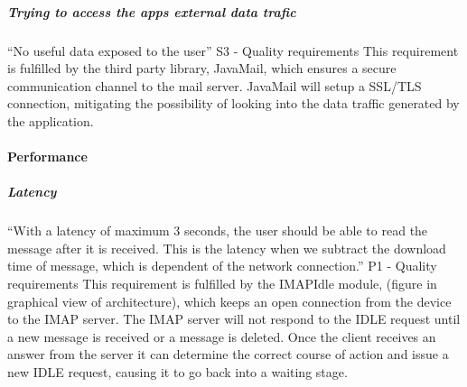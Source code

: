 \subparagraph{Trying to access the apps external data trafic}
“No useful data exposed to the user” S3 - Quality requirements
\newline
\newline
This requirement is fulfilled by the third party library, JavaMail, which ensures a secure communication channel to the mail server. JavaMail  will setup a SSL/TLS connection, mitigating the possibility of looking into the data traffic generated by the application.

\paragraph{Performance}

\subparagraph{Latency}
“With a latency of maximum 3 seconds, the user should be able to read the message after it is received. This is the latency when we subtract the download time of message, which is dependent of the network connection.” P1 - Quality requirements
\newline
\newline
This requirement is fulfilled by the IMAPIdle module, (figure in graphical view of architecture), which keeps an open connection from the device to the IMAP server. The IMAP server will not respond to the IDLE request until a new message is received or a message is deleted. Once the client receives an answer from the server it can determine the correct course of action and issue a new IDLE request, causing it to go back into a waiting stage. 